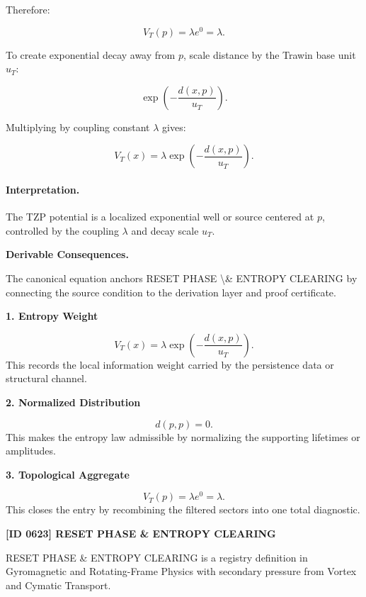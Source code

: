 Therefore:

\begin{equation}
V_T(p)=\lambda e^0=\lambda .
\end{equation}

To create exponential decay away from $p$, scale distance by the Trawin base unit $u_T$:

\begin{equation}
\exp\left(-\frac{d(x,p)}{u_T}\right).
\end{equation}

Multiplying by coupling constant $\lambda$ gives:

\begin{equation}
\boxed{
V_T(x)
=
\lambda
\exp\left(
-\frac{d(x,p)}{u_T}
\right).
}
\end{equation}

\paragraph{Interpretation.}
The TZP potential is a localized exponential well or source centered at $p$, controlled by the coupling $\lambda$ and decay scale $u_T$.

\par\vspace{0.35em}
\noindent\textbf{Derivable Consequences.}\quad
\begingroup
\footnotesize
\raggedright
The canonical equation anchors RESET PHASE \textbackslash{}\& ENTROPY CLEARING by connecting the source condition to the derivation layer and proof certificate.
\par\endgroup

\noindent\textbf{1. Entropy Weight}\par
\[
V_T(x) = \lambda \exp\left( -\frac{d(x,p)}{u_T} \right).
\]
\noindent This records the local information weight carried by the persistence data or structural channel.\par
\noindent\textbf{2. Normalized Distribution}\par
\[
d(p,p)=0.
\]
\noindent This makes the entropy law admissible by normalizing the supporting lifetimes or amplitudes.\par
\noindent\textbf{3. Topological Aggregate}\par
\[
V_T(p)=\lambda e^0=\lambda.
\]
\noindent This closes the entry by recombining the filtered sectors into one total diagnostic.\par

\clearpage
\noindent\textbf{[ID 0623] RESET PHASE \& ENTROPY CLEARING}\par
\vspace{0.35em}
\begingroup\small
{}
RESET PHASE \& ENTROPY CLEARING is a registry definition in Gyromagnetic and Rotating-Frame Physics with secondary pressure from Vortex and Cymatic Transport.

